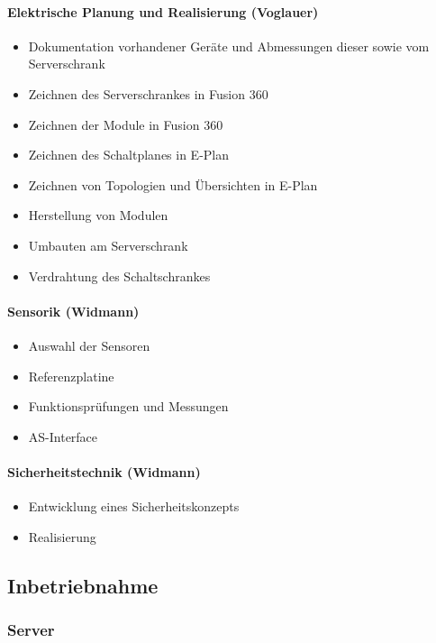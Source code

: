 \paragraph{Elektrische Planung und Realisierung (Voglauer)}
\begin{itemize}
    \item Dokumentation vorhandener Geräte und Abmessungen dieser sowie vom Serverschrank 
    \item Zeichnen des Serverschrankes in Fusion 360
    \item Zeichnen der Module in Fusion 360
    \item Zeichnen des Schaltplanes in E-Plan 
    \item Zeichnen von Topologien und Übersichten in E-Plan 
    \item Herstellung von Modulen 
    \item Umbauten am Serverschrank
    \item Verdrahtung des Schaltschrankes
\end{itemize}

\paragraph{Sensorik (Widmann)}
\begin{itemize}
    \item Auswahl der Sensoren
    \item Referenzplatine
    \item Funktionsprüfungen und Messungen
    \item AS-Interface
\end{itemize}

\paragraph{Sicherheitstechnik (Widmann)}
\begin{itemize}
    \item Entwicklung eines Sicherheitskonzepts
    \item Realisierung
\end{itemize}




\newpage

\subsection{Inbetriebnahme}

\subsubsection{Server}


